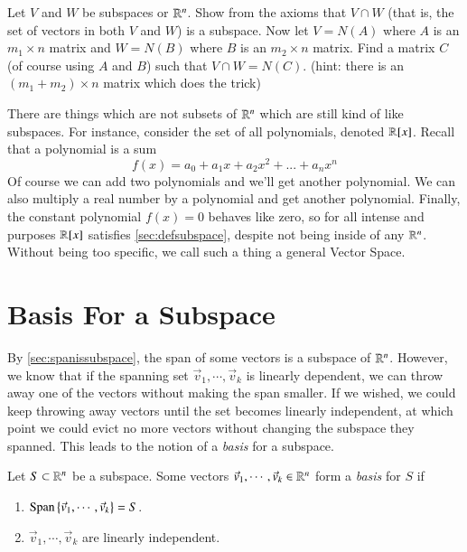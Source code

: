 \begin{Ex}
  Let $V$ and $W$ be subspaces or $\mathbb{R}^n$.  Show from the axioms that $V\cap W$ (that is, the set of vectors in both $V$ and $W$) is a subspace.
  Now let $V=N(A)$ where $A$ is an $m_1\times n$ matrix and $W=N(B)$ where $B$ is an $m_2\times n$ matrix.
  Find a matrix $C$ (of course using $A$ and $B$) such that $V\cap W=N(C)$.  (hint: there is an $(m_1+m_2)\times n$ matrix which does the trick)
\end{Ex}

\begin{UnimportantRemark}
  There are things which are not subsets of $\mathbb{R}^n$ which are still kind of like subspaces.
  For instance, consider the set of all polynomials, denoted $\mathbb{R}[x]$.
  Recall that a polynomial is a sum 
  \[f(x) = a_0 + a_1x + a_2x^2 + ... + a_nx^n\]
  Of course we can add two polynomials and we'll get another polynomial.
  We can also multiply a real number by a polynomial and get another polynomial.
  Finally, the constant polynomial $f(x)=0$ behaves like zero, so for all intense and purposes $\mathbb{R}[x]$ satisfies \ref{sec:defsubspace}, despite not being inside of any $\mathbb{R}^n$.
  Without being too specific, we call such a thing a general Vector Space.  
\end{UnimportantRemark}


\exersisesj

\section{Basis For a Subspace}

By \ref{sec:spanissubspace}, the span of some vectors is a subspace of $\mathbb{R}^n$.
However, we know that if the spanning set $\vec{v}_1,\cdots,\vec{v}_k$ is linearly dependent, we can throw away one of the vectors without making the span smaller.
If we wished, we could keep throwing away vectors until the set becomes linearly independent, at which point we could evict no more vectors without changing the subspace they spanned.  
This leads to the notion of a \emph{basis} for a subspace.

\begin{Def}[Basis]
  Let $S\subset \mathbb{R}^n$ be a subspace.
  Some vectors $\vec{v}_1,\cdots,\vec{v}_k\in \mathbb{R}^n$ form a \emph{basis} for $S$ if
  \begin{enumerate}
  \item $\operatorname{Span}\nolimits\left\{\vec{v}_1,\cdots,\vec{v}_k\right\} = S$.
  \item $\vec{v}_1,\cdots,\vec{v}_k$ are linearly independent.
  \end{enumerate}
\end{Def}

